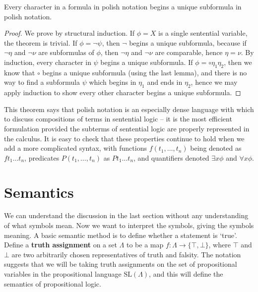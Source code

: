 \begin{theorem}
    Every character in a formula in polish notation begins a unique subformula in polish notation.
\end{theorem}
\begin{proof}
    We prove by structural induction. If $\phi = X$ is a single sentential variable, the theorem is trivial. If $\phi = \neg \psi$, then $\neg$ begins a unique subformula, because if $\neg \eta$ and $\neg \nu$ are subformulas of $\phi$, then $\neg \eta$ and $\neg \nu$ are comparable, hence $\eta = \nu$. By induction, every character in $\psi$ begins a unique subformula. If $\phi = \circ \eta_1 \eta_2$, then we know that $\circ$ begins a unique subformula (using the last lemma), and there is no way to find a subformula $\psi$ which begins in $\eta_1$ and ends in $\eta_2$, hence we may apply induction to show every other character begins a unique subformula.
\end{proof}

This theorem says that polish notation is an especially dense language with which to discuss compositions of terms in sentential logic -- it is the most efficient formulation provided the subterms of sentential logic are properly represented in the calculus. It is easy to check that these properties continue to hold when we add a more complicated syntax, with functions $f(t_1, \dots, t_n)$ being denoted as $ft_1 \dots t_n$, predicates $P(t_1, \dots, t_n)$ as $Pt_1 \dots t_n$, and quantifiers denoted $\exists x \phi$ and $\forall x \phi$.

\section{Semantics}

We can understand the discussion in the last section without any understanding of what symbols mean. Now we want to interpret the symbols, giving the symbols meaning. A basic semantic method is to define whether a statement is `true'. Define a {\bf truth assignment} on a set $\Lambda$ to be a map $f: \Lambda \to \{ \top, \bot \}$, where $\top$ and $\bot$ are two arbitrarily chosen representatives of truth and falsity. The notation suggests that we will be taking truth assignments on the set of propositional variables in the propositional language $\text{SL}(\Lambda)$, and this will define the semantics of propositional logic.

